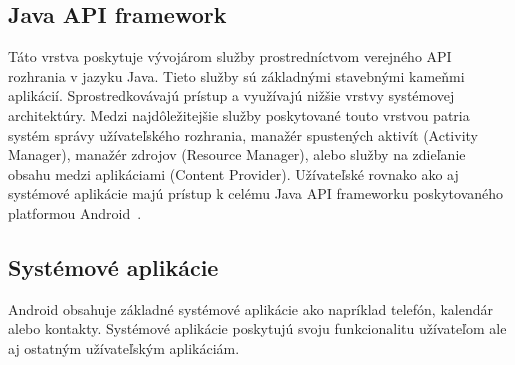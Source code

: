 \subsection{Java API framework}
Táto vrstva poskytuje vývojárom služby prostredníctvom verejného API rozhrania v jazyku Java. Tieto služby sú základnými stavebnými kameňmi aplikácií. Sprostredkovávajú prístup a využívajú nižšie vrstvy systémovej architektúry. Medzi najdôležitejšie služby poskytované touto vrstvou patria systém správy užívateľského rozhrania, manažér spustených aktivít (Activity Manager), manažér zdrojov (Resource Manager), alebo služby na zdieľanie obsahu medzi aplikáciami (Content Provider). 
Užívateľské rovnako ako aj systémové aplikácie majú prístup k celému Java API frameworku poskytovaného platformou Android~\cite{PlatformArchitecture}.

\subsection{Systémové aplikácie}
Android obsahuje základné systémové aplikácie ako napríklad telefón, kalendár alebo kontakty. Systémové aplikácie poskytujú svoju funkcionalitu užívateľom ale aj ostatným užívateľským aplikáciám.		


